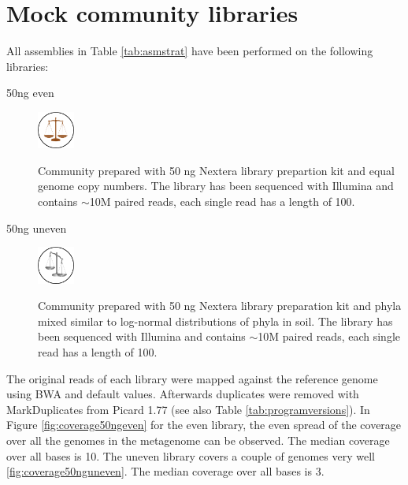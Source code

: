 \documentclass[a4paper,12pt]{report}
\begin{document}
\section{Mock community libraries}
All assemblies in Table \ref{tab:asmstrat} have been performed on the
following libraries:
\begin{description}

\item[50ng even]

    \includegraphics[width=0.1\textwidth]{figures/logos/even.pdf}

    Community prepared with 50 ng Nextera library prepartion kit and equal
genome copy numbers. The library has been sequenced with Illumina and contains
$\sim$10M paired reads, each single read has a length of 100.

\item[50ng uneven]

    \includegraphics[width=0.1\textwidth]{figures/logos/uneven.pdf}
    
    Community prepared with 50 ng Nextera library preparation kit
and phyla mixed similar to log-normal distributions of phyla in soil. The
library has been sequenced with Illumina and contains $\sim$10M paired reads,
each single read has a length of 100.
\end{description}

The original reads of each library were mapped against the reference genome
using BWA \cite{Li20080505} and default values. Afterwards duplicates were
removed with MarkDuplicates from Picard 1.77 (see also Table
\ref{tab:programversions}). In Figure \ref{fig:coverage50ngeven} for the even
library, the even spread of the coverage over all the genomes in the metagenome
can be observed. The median coverage over all bases is 10. The uneven library
covers a couple of genomes very well \ref{fig:coverage50nguneven}. The median
coverage over all bases is 3.\\
\end{document}
